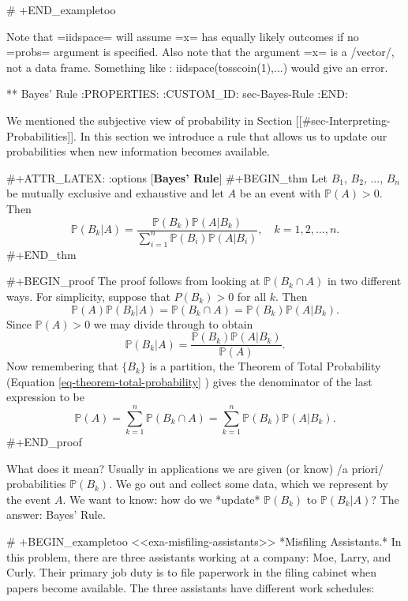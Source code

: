# +END_exampletoo


Note that =iidspace= will assume =x= has equally likely outcomes if no
=probs= argument is specified. Also note that the argument =x= is a
/vector/, not a data frame. Something like 
: iidspace(tosscoin(1),...)
would give an error.

** Bayes' Rule
:PROPERTIES:
:CUSTOM_ID: sec-Bayes-Rule
:END:

We mentioned the subjective view of probability in Section
[[#sec-Interpreting-Probabilities]]. In this section we introduce a rule that
allows us to update our probabilities when new information becomes
available.

#+ATTR_LATEX: :options [\textbf{Bayes' Rule}]
#+BEGIN_thm
Let \(B_{1}\), \(B_{2}\), ..., \(B_{n}\) be mutually exclusive and
exhaustive and let \(A\) be an event with \(\mathbb{P}(A)>0\). Then
\begin{equation}
\label{eq-bayes-rule}
\mathbb{P}(B_{k}|A)=\frac{\mathbb{P}(B_{k})\mathbb{P}(A|B_{k})}{\sum_{i=1}^{n}\mathbb{P}(B_{i})\mathbb{P}(A|B_{i})},\quad k=1,2,\ldots,n.
\end{equation}
#+END_thm

#+BEGIN_proof
The proof follows from looking at \(\mathbb{P}(B_{k}\cap A)\) in two
different ways. For simplicity, suppose that \(P(B_{k})>0\) for all
\(k\). Then \[ \mathbb{P}(A)\mathbb{P}(B_{k}|A)=\mathbb{P}(B_{k}\cap
A)=\mathbb{P}(B_{k})\mathbb{P}(A|B_{k}).  \] Since \(\mathbb{P}(A)>0\)
we may divide through to obtain \[
\mathbb{P}(B_{k}|A)=\frac{\mathbb{P}(B_{k})\mathbb{P}(A|B_{k})}{\mathbb{P}(A)}.
\] Now remembering that \(\{ B_{k} \}\) is a partition, the Theorem of
Total Probability (Equation \eqref{eq-theorem-total-probability} )
gives the denominator of the last expression to be \[
\mathbb{P}(A)=\sum_{k=1}^{n}\mathbb{P}(B_{k}\cap
A)=\sum_{k=1}^{n}\mathbb{P}(B_{k})\mathbb{P}(A|B_{k}).  \]
#+END_proof

What does it mean? Usually in applications we are given (or know) /a
priori/ probabilities \(\mathbb{P}(B_{k})\). We go out and collect
some data, which we represent by the event \(A\). We want to know: how
do we *update* \(\mathbb{P}(B_{k})\) to \(\mathbb{P}(B_{k}|A)\)? The
answer: Bayes' Rule.

# +BEGIN_exampletoo
<<exa-misfiling-assistants>> *Misfiling Assistants.* In this problem,
there are three assistants working at a company: Moe, Larry, and
Curly. Their primary job duty is to file paperwork in the filing
cabinet when papers become available. The three assistants have
different work schedules:


